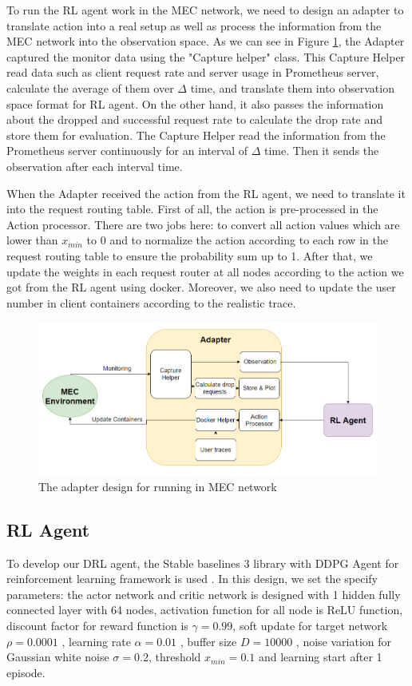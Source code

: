 \documentclass[conference]{IEEEtran}
\begin{document}
To run the RL agent work in the MEC network, we need to design an adapter to translate action into a real setup as well as process the information from the MEC network into the observation space. As we can see in Figure \ref{fig:adapter_design_network_metro}, the Adapter captured the monitor data using the "Capture helper" class. This Capture Helper read data such as client request rate and server usage in Prometheus server, calculate the average of them over $\Delta$ time, and translate them into observation space format for RL agent. On the other hand, it also passes the information about the dropped and successful request rate to calculate the drop rate and store them for evaluation. The Capture Helper read the information from the Prometheus server continuously for an interval of $\Delta$ time. Then it sends the observation after each interval time. 

When the Adapter received the action from the RL agent, we need to translate it into the request routing table. First of all, the action is pre-processed in the Action processor. There are two jobs here: to convert all action values which are lower than $x_{min}$ to 0 and to normalize the action according to each row in the request routing table to ensure the probability sum up to 1. After that, we update the weights in each request router at all nodes according to the action we got from the RL agent using docker. Moreover, we also need to update the user number in client containers according to the realistic trace. 


\begin{figure}[]
    \centering
    \includegraphics[scale = 0.3]{imgs/adapter_design_network_metro.png}
    \caption{The adapter design for running in MEC network}
    \label{fig:adapter_design_network_metro}
\end{figure}

\subsection{RL Agent}
To develop our DRL agent, the Stable baselines 3 library with DDPG Agent for reinforcement learning framework is used \cite{stable-baselines3}. In this design, we set the specify parameters: the actor network and critic network is designed with 1 hidden fully connected layer with 64 nodes, activation function for all node is ReLU function, discount factor for reward function is $\gamma = 0.99$, soft update for target network $\rho = 0.0001$ , learning rate $\alpha = 0.01$ , buffer size $D = 10000$ , noise variation for Gaussian white noise $\sigma = 0.2$, threshold $x_{min} = 0.1$ and learning start after 1 episode.
\end{document}
